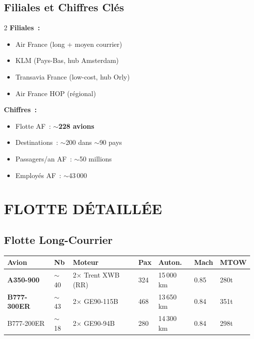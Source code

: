 \documentclass[11pt,a4paper]{article}
\begin{document}
\subsection{Filiales et Chiffres Clés}

\begin{multicols}{2}
\textbf{Filiales~:}
\begin{itemize}[nosep]
\item Air France (long + moyen courrier)
\item KLM (Pays-Bas, hub Amsterdam)
\item Transavia France (low-cost, hub Orly)
\item Air France HOP (régional)
\end{itemize}
\columnbreak
\textbf{Chiffres~:}
\begin{itemize}[nosep]
\item Flotte AF~: $\sim$\textbf{228 avions}
\item Destinations~: $\sim$200 dans $\sim$90 pays
\item Passagers/an AF~: $\sim$50 millions
\item Employés AF~: $\sim$43\,000
\end{itemize}
\end{multicols}

\section{FLOTTE DÉTAILLÉE}

\subsection{Flotte Long-Courrier}

\begin{tabular}{p{3cm}p{1.5cm}p{3cm}p{1.5cm}p{1.5cm}p{1.5cm}p{1.5cm}}
\toprule
\textbf{Avion} & \textbf{Nb} & \textbf{Moteur} & \textbf{Pax} & \textbf{Auton.} & \textbf{Mach} & \textbf{MTOW} \\
\midrule
\rowcolor{aflight}
\textbf{A350-900} & $\sim$40 & 2$\times$ Trent XWB (RR) & 324 & 15\,000 km & 0.85 & 280t \\
\textbf{B777-300ER} & $\sim$43 & 2$\times$ GE90-115B & 468 & 13\,650 km & 0.84 & 351t \\
B777-200ER & $\sim$18 & 2$\times$ GE90-94B & 280 & 14\,300 km & 0.84 & 298t \\
\bottomrule
\end{tabular}
\end{document}
